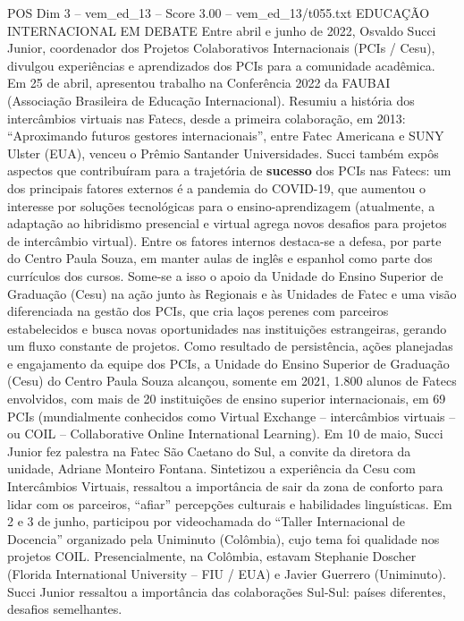 \begin{textsample}{POS Dim 3 – vem\_ed\_13 – Score 3.00 – vem\_ed\_13/t055.txt}  \label{ex:f3_pos_131}
EDUCAÇÃO INTERNACIONAL EM DEBATE Entre abril e junho de 2022, Osvaldo Succi Junior, coordenador dos Projetos Colaborativos Internacionais (PCIs / Cesu), divulgou experiências e aprendizados dos PCIs para a comunidade acadêmica.
Em 25 de abril, apresentou trabalho na Conferência 2022 da FAUBAI (Associação Brasileira de Educação Internacional).
Resumiu a história dos intercâmbios virtuais nas Fatecs, desde a primeira colaboração, em 2013: “Aproximando futuros gestores internacionais”, entre Fatec Americana e SUNY Ulster (EUA), venceu o Prêmio Santander Universidades.
Succi também expôs aspectos que contribuíram para a trajetória de \textbf{sucesso} dos PCIs nas Fatecs: um dos principais fatores externos é a pandemia do COVID-19, que aumentou o interesse por soluções tecnológicas para o ensino-aprendizagem (atualmente, a adaptação ao hibridismo presencial e virtual agrega novos desafios para projetos de intercâmbio virtual).
Entre os fatores internos destaca-se a defesa, por parte do Centro Paula Souza, em manter aulas de inglês e espanhol como parte dos currículos dos cursos.
Some-se a isso o apoio da Unidade do Ensino Superior de Graduação (Cesu) na ação junto às Regionais e às Unidades de Fatec e uma visão diferenciada na gestão dos PCIs, que cria laços perenes com parceiros estabelecidos e busca novas oportunidades nas instituições estrangeiras, gerando um fluxo constante de projetos.
Como resultado de persistência, ações planejadas e engajamento da equipe dos PCIs, a Unidade do Ensino Superior de Graduação (Cesu) do Centro Paula Souza alcançou, somente em 2021, 1.800 alunos de Fatecs envolvidos, com mais de 20 instituições de ensino superior internacionais, em 69 PCIs (mundialmente conhecidos como Virtual Exchange – intercâmbios virtuais – ou COIL – Collaborative Online International Learning).
Em 10 de maio, Succi Junior fez palestra na Fatec São Caetano do Sul, a convite da diretora da unidade, Adriane Monteiro Fontana.
Sintetizou a experiência da Cesu com Intercâmbios Virtuais, ressaltou a importância de sair da zona de conforto para lidar com os parceiros, “afiar” percepções culturais e habilidades linguísticas.
Em 2 e 3 de junho, participou por videochamada do “Taller Internacional de Docencia” organizado pela Uniminuto (Colômbia), cujo tema foi qualidade nos projetos COIL.
Presencialmente, na Colômbia, estavam Stephanie Doscher (Florida International University – FIU / EUA) e Javier Guerrero (Uniminuto).
Succi Junior ressaltou a importância das colaborações Sul-Sul: países diferentes, desafios semelhantes.

\end{textsample}
